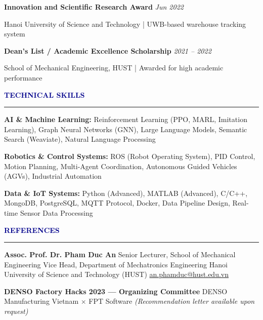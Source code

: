 \documentclass[11pt,letterpaper]{article}
\newcommand{\sectiontitle}[1]{
  \vspace{0.3em}
  {\large\textbf{\textcolor{darkblue}{#1}}}
  \vspace{0.2em}
  \hrule
  \vspace{0.3em}
}
\newcommand{\subsectiontitle}[2]{
  \textbf{#1} \hfill \textit{#2}
  \vspace{0.2em}
}
\begin{document}
\subsectiontitle{Innovation and Scientific Research Award}{Jun 2022}
Hanoi University of Science and Technology | UWB-based warehouse tracking system
\vspace{0.3em}

\subsectiontitle{Dean's List / Academic Excellence Scholarship}{2021 -- 2022}
School of Mechanical Engineering, HUST | Awarded for high academic performance
\vspace{0.3em}

\sectiontitle{TECHNICAL SKILLS}

\textbf{AI \& Machine Learning:} Reinforcement Learning (PPO, MARL, Imitation Learning), Graph Neural Networks (GNN), Large Language Models, Semantic Search (Weaviate), Natural Language Processing

\vspace{0.2em}
\textbf{Robotics \& Control Systems:} ROS (Robot Operating System), PID Control, Motion Planning, Multi-Agent Coordination, Autonomous Guided Vehicles (AGVs), Industrial Automation

\vspace{0.2em}
\textbf{Data \& IoT Systems:} Python (Advanced), MATLAB (Advanced), C/C++, MongoDB, PostgreSQL, MQTT Protocol, Docker, Data Pipeline Design, Real-time Sensor Data Processing

\sectiontitle{REFERENCES}

\textbf{Assoc. Prof. Dr. Pham Duc An}
\newline
Senior Lecturer, School of Mechanical Engineering
\newline
Vice Head, Department of Mechatronics Engineering
\newline
Hanoi University of Science and Technology (HUST)
\newline
\href{mailto:an.phamduc@hust.edu.vn}{an.phamduc@hust.edu.vn}

\vspace{0.5em}
\textbf{DENSO Factory Hacks 2023 --- Organizing Committee}
\newline
DENSO Manufacturing Vietnam $\times$ FPT Software
\newline
\textit{(Recommendation letter available upon request)}
\end{document}
